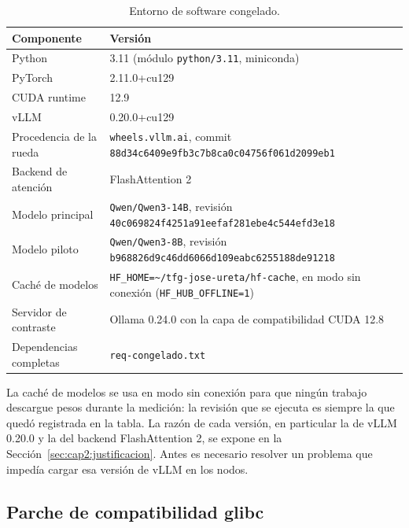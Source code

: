 \begin{table}[htbp]
  \centering
  \caption{Entorno de software congelado.}
  \label{tab:cap2:entorno}
  \small
  \begin{tabular}{|p{}|p{}|}
    \hline
    \textbf{Componente} & \textbf{Versión} \\
    \hline
    Python & 3.11 (módulo \texttt{python/3.11}, miniconda) \\
    \hline
    PyTorch & 2.11.0+cu129 \\
    \hline
    CUDA runtime & 12.9 \\
    \hline
    vLLM & 0.20.0+cu129 \\
    \hline
    Procedencia de la rueda & \texttt{wheels.vllm.ai}, commit \texttt{88d34c6409\allowbreak e9fb3c7b8c\allowbreak a0c04756f0\allowbreak 61d2099eb1} \\
    \hline
    Backend de atención & FlashAttention 2 \\
    \hline
    Modelo principal & \texttt{Qwen/Qwen3-14B}, revisión \texttt{40c069824f\allowbreak 4251a91eef\allowbreak af281ebe4c\allowbreak 544efd3e18} \\
    \hline
    Modelo piloto & \texttt{Qwen/Qwen3-8B}, revisión \texttt{b968826d9c\allowbreak 46dd6066d1\allowbreak 09eabc6255\allowbreak 188de91218} \\
    \hline
    Caché de modelos & \texttt{HF\_HOME=\textasciitilde/tfg-jose-ureta/hf-cache}, en modo sin conexión (\texttt{HF\_HUB\_OFFLINE=1}) \\
    \hline
    Servidor de contraste & Ollama 0.24.0 con la capa de compatibilidad CUDA 12.8 \\
    \hline
    Dependencias completas & \texttt{req-congelado.txt} \\
    \hline
  \end{tabular}
\end{table}

La caché de modelos se usa en modo sin conexión para que ningún trabajo descargue pesos durante la medición: la revisión que se ejecuta es siempre la que quedó registrada en la tabla. La razón de cada versión, en particular la de vLLM 0.20.0 y la del backend FlashAttention 2, se expone en la Sección~\ref{sec:cap2:justificacion}. Antes es necesario resolver un problema que impedía cargar esa versión de vLLM en los nodos.

\subsection{Parche de compatibilidad glibc}
\label{sec:cap2:parche}

